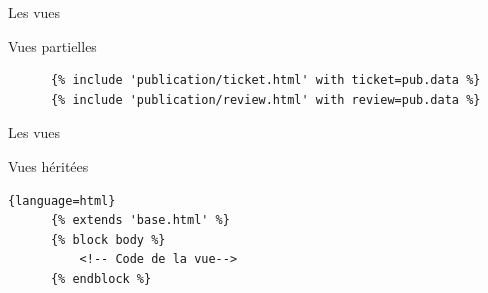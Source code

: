 \begin{frame}[fragile]{Les vues}
  \begin{block}{Vues partielles}
    \tiny
    \begin{center}
    \end{center}

    \begin{lstlisting}
      {% include 'publication/ticket.html' with ticket=pub.data %}
      {% include 'publication/review.html' with review=pub.data %}
    \end{lstlisting}
  \end{block}
\end{frame}

\begin{frame}[fragile]{Les vues}
  \begin{block}{Vues héritées}
    \tiny
    \begin{lstlisting}{language=html}
      {% extends 'base.html' %}
      {% block body %}
          <!-- Code de la vue-->
      {% endblock %}
    \end{lstlisting}
  \end{block}
\end{frame}
